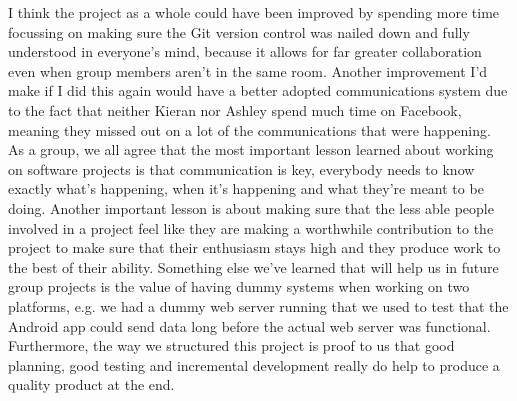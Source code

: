 \documentclass{article}
\begin{document}
		I think the project as a whole could have been improved by spending more time focussing on making sure the Git version control was nailed down and fully understood in everyone's mind, because it allows for far greater collaboration even when group members aren't in the same room. Another improvement I'd make if I did this again would have a better adopted communications system due to the fact that neither Kieran nor Ashley spend much time on Facebook, meaning they missed out on a lot of the communications that were happening. \\

		As a group, we all agree that the most important lesson learned about working on software projects is that communication is key, everybody needs to know exactly what's happening, when it's happening and what they're meant to be doing. Another important lesson is about making sure that the less able people involved in a project feel like they are making a worthwhile contribution to the project to make sure that their enthusiasm stays high and they produce work to the best of their ability. Something else we've learned that will help us in future group projects is the value of having dummy systems when working on two platforms, e.g. we had a dummy web server running that we used to test that the Android app could send data long before the actual web server was functional. Furthermore, the way we structured this project is proof to us that good planning, good testing and incremental development really do help to produce a quality product at the end.
	
\end{document}
